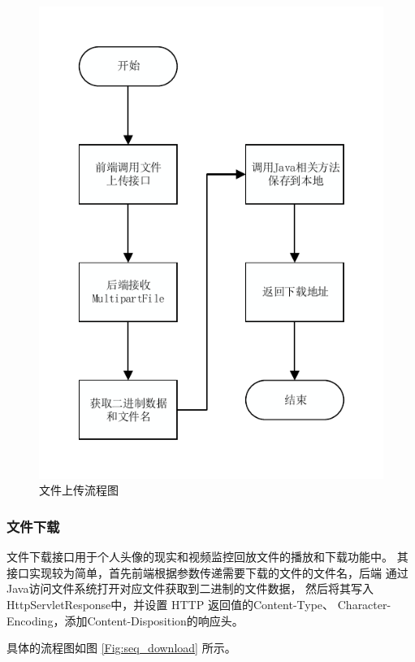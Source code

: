 \begin{figure}[ht]
    \centering
    \includegraphics[width=0.8\linewidth]{./Figure/IMG_seq_upload.pdf}
    \caption{文件上传流程图}\label{Fig:seq_upload}
\end{figure}

\subsubsection{文件下载}
文件下载接口用于个人头像的现实和视频监控回放文件的播放和下载功能中。
其接口实现较为简单，首先前端根据参数传递需要下载的文件的文件名，后端
通过Java访问文件系统打开对应文件获取到二进制的文件数据，
然后将其写入HttpServletResponse中，并设置 HTTP 返回值的Content-Type、
Character-Encoding，添加Content-Disposition的响应头。

具体的流程图如图 \ref{Fig:seq_download} 所示。

